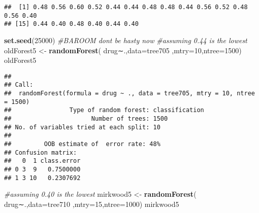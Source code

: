 \documentclass[]{article}
\newenvironment{Shaded}{\begin{snugshade}}{\end{snugshade}}
\newcommand{\KeywordTok}[1]{\textcolor[rgb]{0.13,0.29,0.53}{\textbf{#1}}}
\newcommand{\DataTypeTok}[1]{\textcolor[rgb]{0.13,0.29,0.53}{#1}}
\newcommand{\DecValTok}[1]{\textcolor[rgb]{0.00,0.00,0.81}{#1}}
\newcommand{\StringTok}[1]{\textcolor[rgb]{0.31,0.60,0.02}{#1}}
\newcommand{\CommentTok}[1]{\textcolor[rgb]{0.56,0.35,0.01}{\textit{#1}}}
\newcommand{\ControlFlowTok}[1]{\textcolor[rgb]{0.13,0.29,0.53}{\textbf{#1}}}
\newcommand{\OperatorTok}[1]{\textcolor[rgb]{0.81,0.36,0.00}{\textbf{#1}}}
\newcommand{\NormalTok}[1]{#1}
\begin{document}
\begin{Shaded}
\end{Shaded}

\begin{verbatim}
##  [1] 0.48 0.56 0.60 0.52 0.44 0.44 0.48 0.48 0.44 0.56 0.52 0.48 0.56 0.40
## [15] 0.44 0.40 0.48 0.40 0.44 0.40
\end{verbatim}

\begin{Shaded}
\begin{Highlighting}[]
\KeywordTok{set.seed}\NormalTok{(}\DecValTok{25000}\NormalTok{)}
\CommentTok{#BAROOM dont be hasty now}
\CommentTok{#assuming 0.44 is the lowest}
\NormalTok{oldForest5 <-}\StringTok{ }\KeywordTok{randomForest}\NormalTok{( drug∼.,}\DataTypeTok{data=}\NormalTok{tree705  ,}\DataTypeTok{mtry=}\DecValTok{10}\NormalTok{,}\DataTypeTok{ntree=}\DecValTok{1500}\NormalTok{)}
\NormalTok{oldForest5}
\end{Highlighting}
\end{Shaded}

\begin{verbatim}
## 
## Call:
##  randomForest(formula = drug ~ ., data = tree705, mtry = 10, ntree = 1500) 
##                Type of random forest: classification
##                      Number of trees: 1500
## No. of variables tried at each split: 10
## 
##         OOB estimate of  error rate: 48%
## Confusion matrix:
##   0  1 class.error
## 0 3  9   0.7500000
## 1 3 10   0.2307692
\end{verbatim}

\begin{Shaded}
\begin{Highlighting}[]
\CommentTok{#assuming 0.40 is the lowest}
\NormalTok{mirkwood5 <-}\StringTok{ }\KeywordTok{randomForest}\NormalTok{( drug∼.,}\DataTypeTok{data=}\NormalTok{tree710  ,}\DataTypeTok{mtry=}\DecValTok{15}\NormalTok{,}\DataTypeTok{ntree=}\DecValTok{1000}\NormalTok{)}
\NormalTok{mirkwood5}
\end{Highlighting}
\end{Shaded}
\end{document}
